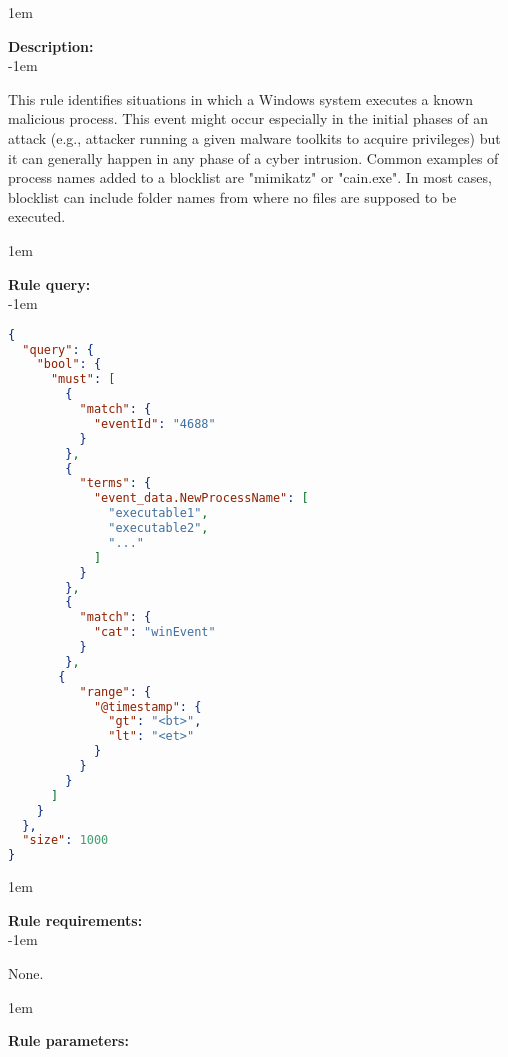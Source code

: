 \openup 1em

{\bf Description:} \\

\openup -1em
\vspace{-2em}


This rule identifies situations in which a Windows system executes a known malicious process. This event might occur especially in the initial phases of an attack (e.g., attacker running a given malware toolkits to acquire privileges) but it can generally happen in any phase of a cyber intrusion. Common examples of process names added to a blocklist are "mimikatz" or "cain.exe". In most cases, blocklist can include folder names from where no files are supposed to be executed.

\openup 1em

{\bf Rule query:} \\

\openup -1em
\vspace{-2em}

\begin{lstlisting}[language=json,firstnumber=1]
{
  "query": {
    "bool": {
      "must": [
        {
          "match": {
            "eventId": "4688"
          }
        },
        {
          "terms": {
            "event_data.NewProcessName": [
              "executable1",
              "executable2",
              "..."
            ]
          }
        },
        {
          "match": {
            "cat": "winEvent"
          }
        },
       {
          "range": {
            "@timestamp": {
              "gt": "<bt>",
              "lt": "<et>"
            }
          }
        }
      ]
    }
  },
  "size": 1000
}
\end{lstlisting}

\openup 1em

{\bf Rule requirements:} \\

\openup -1em
\vspace{-2em}

None.

\openup 1em

{\bf Rule parameters:} \\

